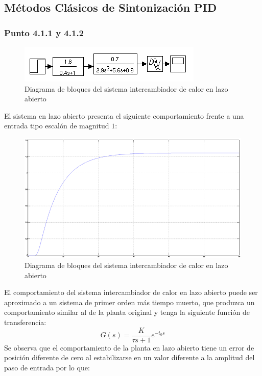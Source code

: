 \documentclass[twocolumn]{IEEEtran}
\begin{document}
\subsection{Métodos Clásicos de Sintonización PID}
\noindent

\subsubsection{Punto 4.1.1 y 4.1.2}
\noindent
\begin{figure}[H]
	\centering
		\includegraphics[scale=1]{tf1.png}
	\caption{Diagrama de bloques del sistema intercambiador de calor en lazo abierto}
	\label{fig1}
\end{figure}
\noindent
El sistema en lazo abierto presenta el siguiente comportamiento frente a una entrada tipo escalón de magnitud $1$:
\begin{figure}[H]
	\centering
		\includegraphics[scale=0.35]{simulation11.png}
	\caption{Diagrama de bloques del sistema intercambiador de calor en lazo abierto}
	\label{fig12}
\end{figure}
\noindent
El comportamiento del sistema intercambiador de calor en lazo abierto puede ser aproximado a un sistema de primer orden más tiempo muerto, que produzca un comportamiento similar al de la planta original y tenga la siguiente función de transferencia:
\begin{equation}
 G\left( s \right) = \frac{K}{{\tau s + 1}}e^{ - t_0 s} 
\label{ecu101}
\end{equation}
\noindent
Se observa que el comportamiento de la planta en lazo abierto tiene un error de posición diferente de cero  al estabilizarse en un valor diferente a la amplitud del paso de entrada por lo que:
\end{document}

